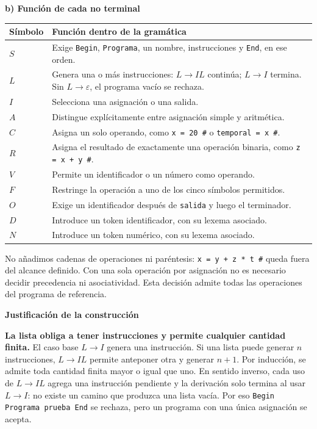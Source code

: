 \documentclass[11pt,letterpaper]{article}
\newcommand{\cod}[1]{\texttt{#1}}
\newcommand{\subtitulo}[1]{\vspace{5pt}\textbf{#1}\par\nopagebreak[4]}
\newcommand{\cab}[1]{\rowcolor{cabecera}#1}
\begin{document}
\subtitulo{b) Función de cada no terminal}
\begin{tabularx}{\textwidth}{|p{1.6cm}|X|}\hline
\cab{\textbf{Símbolo}&\textbf{Función dentro de la gramática}}\\\hline
$S$&Exige \cod{Begin}, \cod{Programa}, un nombre, instrucciones y \cod{End}, en ese orden.\\\hline
$L$&Genera una o más instrucciones: $L\to IL$ continúa; $L\to I$ termina. Sin $L\to\varepsilon$, el programa vacío se rechaza.\\\hline
$I$&Selecciona una asignación o una salida.\\\hline
$A$&Distingue explícitamente entre asignación simple y aritmética.\\\hline
$C$&Asigna un solo operando, como \cod{x = 20 \#} o \cod{temporal = x \#}.\\\hline
$R$&Asigna el resultado de exactamente una operación binaria, como \cod{z = x + y \#}.\\\hline
$V$&Permite un identificador o un número como operando.\\\hline
$F$&Restringe la operación a uno de los cinco símbolos permitidos.\\\hline
$O$&Exige un identificador después de \cod{salida} y luego el terminador.\\\hline
$D$&Introduce un token identificador, con su lexema asociado.\\\hline
$N$&Introduce un token numérico, con su lexema asociado.\\\hline
\end{tabularx}

No añadimos cadenas de operaciones ni paréntesis: \cod{x = y + z * t \#} queda fuera del alcance definido. Con una sola operación por asignación no es necesario decidir precedencia ni asociatividad. Esta decisión admite todas las operaciones del programa de referencia.

\newpage
\subtitulo{Justificación de la construcción}
\textbf{La lista obliga a tener instrucciones y permite cualquier cantidad finita.} El caso base $L\to I$ genera una instrucción. Si una lista puede generar $n$ instrucciones, $L\to IL$ permite anteponer otra y generar $n+1$. Por inducción, se admite toda cantidad finita mayor o igual que uno. En sentido inverso, cada uso de $L\to IL$ agrega una instrucción pendiente y la derivación solo termina al usar $L\to I$: no existe un camino que produzca una lista vacía. Por eso \cod{Begin Programa prueba End} se rechaza, pero un programa con una única asignación se acepta.
\end{document}
